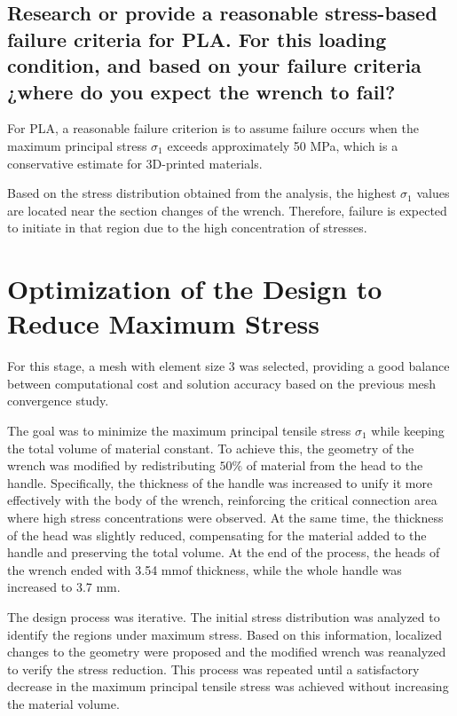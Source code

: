 \documentclass[12pt]{article}
\begin{document}
\subsection{Research or provide a reasonable stress-based failure criteria for PLA. For this loading condition, and based on your failure criteria ¿where do you expect the wrench to fail?}

For PLA, a reasonable failure criterion is to assume failure occurs when the maximum principal stress $\sigma_1$ exceeds approximately 50 MPa, which is a conservative estimate for 3D-printed materials.

Based on the stress distribution obtained from the analysis, the highest $\sigma_1$ values are located near the section changes of the wrench.  
Therefore, failure is expected to initiate in that region due to the high concentration of stresses.


\section{Optimization of the Design to Reduce Maximum Stress}

For this stage, a mesh with element size $3$ was selected, providing a good balance between computational cost and solution accuracy based on the previous mesh convergence study.

The goal was to minimize the maximum principal tensile stress $\sigma_1$ while keeping the total volume of material constant.  
To achieve this, the geometry of the wrench was modified by redistributing $50\%$ of material from the head to the handle.
Specifically, the thickness of the handle was increased to unify it more effectively with the body of the wrench, reinforcing the critical connection area where high stress concentrations were observed.  
At the same time, the thickness of the head was slightly reduced, compensating for the material added to the handle and preserving the total volume. At the end of the process, the heads of the wrench ended with 3.54 mmof thickness, while the whole handle was increased to 3.7 mm.

The design process was iterative. The initial stress distribution was analyzed to identify the regions under maximum stress. Based on this information, localized changes to the geometry were proposed and the modified wrench was reanalyzed to verify the stress reduction.  
This process was repeated until a satisfactory decrease in the maximum principal tensile stress was achieved without increasing the material volume.
\end{document}
